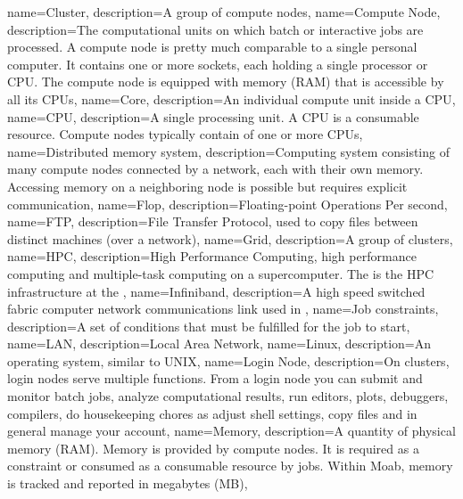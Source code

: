 {
  name={Cluster},
  description={A group of compute nodes},
}
{
  name={Compute Node},
  description={The computational units on which batch or interactive jobs are processed. A compute node is pretty much comparable to a single personal computer. It contains one or more sockets, each holding a single processor or CPU. The compute node is equipped with memory (RAM) that is accessible by all its CPUs},
}
{
  name={Core},
  description={An individual compute unit inside a CPU},
}
{
  name={CPU},
  description={A single processing unit. A CPU is a consumable resource. Compute nodes typically contain of one or more CPUs},
}
{
  name={Distributed memory system},
  description={Computing system consisting of many compute nodes connected by a network, each with their own memory. Accessing memory on a neighboring node is possible but requires explicit communication},
}
{
  name={Flop},
  description={Floating-point Operations Per second},
}
{
  name={FTP},
  description={File Transfer Protocol, used to copy files between distinct machines (over a network)},
}
{
  name={Grid},
  description={A group of clusters},
}
{
  name={HPC},
  description={High Performance Computing, high performance computing and multiple-task computing on a supercomputer. The \hpc is the HPC infrastructure at the \university},
}
{
  name={Infiniband},
  description={A high speed switched fabric computer network communications link used in \hpc},
}
{
  name={Job constraints},
  description={A set of conditions that must be fulfilled for the job to start},
}
{
  name={LAN},
  description={Local Area Network},
}
{
  name={Linux},
  description={An operating system, similar to UNIX},
}
{
  name={Login Node},
  description={On \hpc clusters, login nodes serve multiple functions. From a login node you can submit and monitor batch jobs, analyze computational results, run editors, plots, debuggers, compilers, do housekeeping chores as adjust shell settings, copy files and in general manage your account},
}
{
  name={Memory},
  description={A quantity of physical memory (RAM). Memory is provided by compute nodes. It is required as a constraint or consumed as a consumable resource by jobs. Within Moab, memory is tracked and reported in megabytes (MB)},
}
